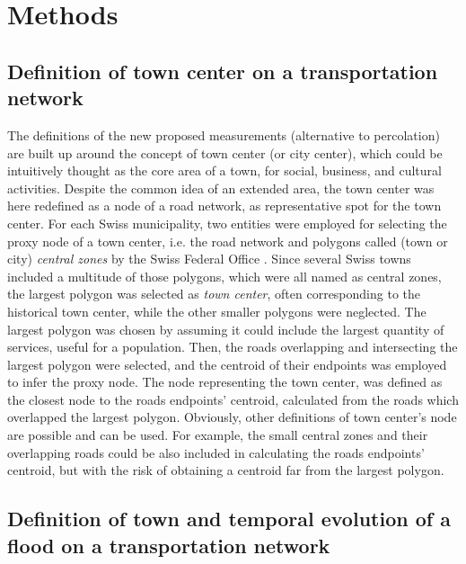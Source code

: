\documentclass[twocolumn,fleqn,10pt]{wlscirep}
\begin{document}
\section*{Methods}




\subsection{Definition of town center on a transportation network}
\label{towncenter} 




The definitions of the new proposed measurements (alternative to percolation) are built up around the concept of town center (or city center), which could be intuitively thought as the core area of a town, for social, business, and cultural activities. Despite the common idea of an extended area, the town center was here redefined as a node of a road network, as representative spot for the town center. For each Swiss municipality, two entities were employed for selecting the proxy node of a town center, i.e. the road network and polygons called (town or city) \emph{central zones} by the Swiss Federal Office \cite{SwissFederalOffice}. 
Since several Swiss towns included a multitude of those polygons, which were all named as central zones, the largest polygon was selected as \emph{town center}, often corresponding to the historical town center, while the other smaller polygons were neglected. The largest polygon was chosen by assuming it could include the largest quantity of services, useful for a population. Then, the roads overlapping and intersecting the largest polygon 
were selected, and the centroid of their endpoints was employed to infer the proxy node. The node representing the town center, 
was defined as the closest node to the roads endpoints' centroid, calculated from the roads which overlapped the largest polygon. Obviously, other definitions of town center's node are possible and can be used. For example, the small central zones and their overlapping roads could be also included in calculating the roads endpoints' centroid, but with the risk of obtaining a centroid far from the largest polygon.

\subsection{Definition of town and temporal evolution of a flood on a transportation network}
\label{town_and_flood_evolution} 
\end{document}
